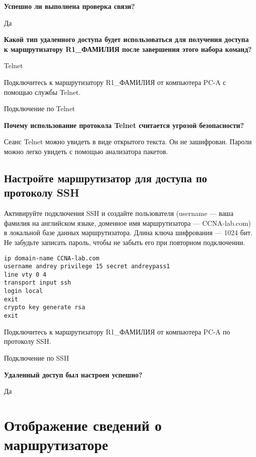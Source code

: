 \textbf{Успешно ли выполнена проверка связи?}

Да

\textbf{Какой тип удаленного доступа будет использоваться для получения
доступа к маршрутизатору R1\_ФАМИЛИЯ после завершения этого набора команд?}

Telnet

Подключитесь к маршрутизатору R1\_ФАМИЛИЯ
от компьютера PC-A с помощью службы Telnet.

\begin{image}
	\caption{Подключение по Telnet}
\end{image}

\textbf{Почему использование протокола Telnet считается угрозой безопасности?}

Сеанс Telnet можно увидеть в виде открытого текста. Он не зашифрован.
Пароли можно легко увидеть с помощью анализатора пакетов.

\subsection{Настройте маршрутизатор для доступа по протоколу SSH}
Активируйте подключения SSH и создайте пользователя
(username --- ваша фамилия на английском языке,
доменное имя маршрутизатора --- CCNA-lab.com)
в локальной базе данных маршрутизатора. Длина ключа шифрования --- 1024 бит.
Не забудьте записать пароль, чтобы не забыть его при повторном подключении.

\begin{verbatim}
ip domain-name CCNA-lab.com
username andrey privilege 15 secret andreypass1
line vty 0 4
transport input ssh
login local
exit
crypto key generate rsa
exit
\end{verbatim}

Подключитесь к маршрутизатору R1\_ФАМИЛИЯ
от компьютера PC-A по протоколу SSH.

\begin{image}
	\caption{Подключение по SSH}
\end{image}

\textbf{Удаленный доступ был настроен успешно?}

Да

\section{Отображение сведений о маршрутизаторе}

